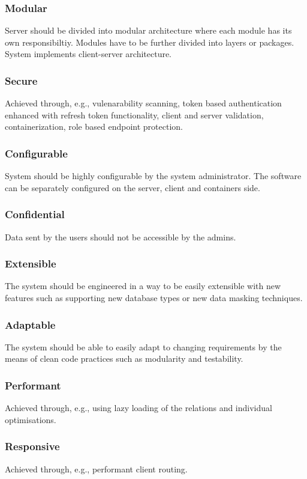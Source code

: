 \documentclass[a4paper,twoside,12pt]{book}
\begin{document}
\subsubsection{Modular}
Server should be divided into modular architecture where each module has its own responsibiltiy. Modules have to be further divided into layers or packages. System implements client-server architecture.

\subsubsection{Secure}
Achieved through, e.g., vulenarability scanning, token based authentication enhanced with refresh token functionality, client and server validation, containerization, role based endpoint protection.

\subsubsection{Configurable}
System should be highly configurable by the system administrator. The software can be separately configured on the server, client and containers side.

\subsubsection{Confidential}
Data sent by the users should not be accessible by the admins.

\subsubsection{Extensible}
The system should be engineered in a way to be easily extensible with new features such as supporting new database types or new data masking techniques.

\subsubsection{Adaptable}
The system should be able to easily adapt to changing requirements by the means of clean code practices such as modularity and testability.

\subsubsection{Performant}
Achieved through, e.g., using lazy loading of the relations and individual optimisations.

\subsubsection{Responsive}
Achieved through, e.g., performant client routing.
\end{document}
